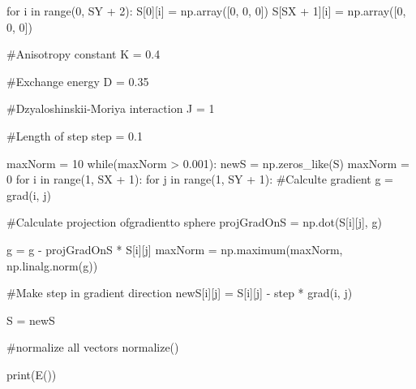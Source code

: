 \documentclass[ 12pt,x11names]{article}
\begin{document}
\begin{python}
    for i in range(0, SY + 2):
        S[0][i] = np.array([0, 0, 0])
        S[SX + 1][i] = np.array([0, 0, 0])

    #Anisotropy constant
    K = 0.4

    #Exchange energy
    D = 0.35

    #Dzyaloshinskii-Moriya interaction
    J = 1

    #Length of step
    step = 0.1

    maxNorm = 10
    while(maxNorm > 0.001):
        newS = np.zeros_like(S)
        maxNorm = 0
        for i in range(1, SX + 1):
            for j in range(1, SY + 1):
                #Calculte gradient
                g = grad(i,  j)

                #Calculate projection ofgradientto sphere
                projGradOnS = np.dot(S[i][j], g)

                g = g - projGradOnS * S[i][j]
                maxNorm = np.maximum(maxNorm, np.linalg.norm(g))

                #Make step in gradient direction
                newS[i][j] = S[i][j] - step * grad(i, j)

        S = newS

        #normalize all vectors
        normalize()

print(E())
\end{python}
\end{document}
